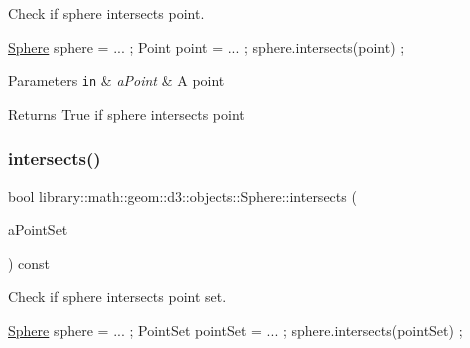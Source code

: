 Check if sphere intersects point. 


\begin{DoxyCode}
\hyperlink{classlibrary_1_1math_1_1geom_1_1d3_1_1objects_1_1_sphere_a55dccc8ea16ee55cd7694c26afa8ea39}{Sphere} sphere = ... ;
Point point = ... ;
sphere.intersects(point) ;
\end{DoxyCode}



\begin{DoxyParams}[1]{Parameters}
\mbox{\tt in}  & {\em a\+Point} & A point \\
\hline
\end{DoxyParams}
\begin{DoxyReturn}{Returns}
True if sphere intersects point 
\end{DoxyReturn}
\mbox{\label{classlibrary_1_1math_1_1geom_1_1d3_1_1objects_1_1_sphere_a3b92bc83fc458553437b7e2a50849859}} 
\subsubsection{\texorpdfstring{intersects()}{intersects()}\hspace{0.1cm}{\footnotesize\ttfamily [2/8]}}
{\footnotesize\ttfamily bool library\+::math\+::geom\+::d3\+::objects\+::\+Sphere\+::intersects (\begin{DoxyParamCaption}\item[{const \hyperlink{classlibrary_1_1math_1_1geom_1_1d3_1_1objects_1_1_point_set}{Point\+Set} \&}]{a\+Point\+Set }\end{DoxyParamCaption}) const}



Check if sphere intersects point set. 


\begin{DoxyCode}
\hyperlink{classlibrary_1_1math_1_1geom_1_1d3_1_1objects_1_1_sphere_a55dccc8ea16ee55cd7694c26afa8ea39}{Sphere} sphere = ... ;
PointSet pointSet = ... ;
sphere.intersects(pointSet) ;
\end{DoxyCode}



